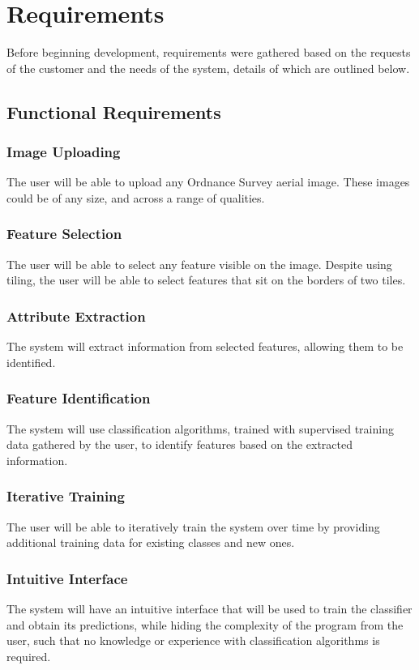 \section{Requirements}
Before beginning development, requirements were gathered based on the requests of the customer and the needs of the system, details of which are outlined below.
\subsection{Functional Requirements} \label{funcreqs}
\subsubsection{Image Uploading}
The user will be able to upload any Ordnance Survey aerial image. These images could be of any size, and across a range of qualities.
\subsubsection{Feature Selection}
The user will be able to select any feature visible on the image. Despite using tiling, the user will be able to select features that sit on the borders of two tiles. 
\subsubsection{Attribute Extraction}
The system will extract information from selected features, allowing them to be identified.
\subsubsection{Feature Identification}
The system will use classification algorithms, trained with supervised training data gathered by the user, to identify features based on the extracted information.
\subsubsection{Iterative Training}
The user will be able to iteratively train the system over time by providing additional training data for existing classes and new ones. 
\subsubsection{Intuitive Interface}
The system will have an intuitive interface that will be used to train the classifier and obtain its predictions, while hiding the complexity of the program from the user, such that no knowledge or experience with classification algorithms is required.

